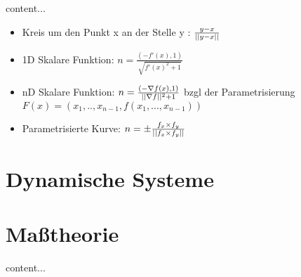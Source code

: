 \begin{definition}[Normalenvektor]
	content...
\end{definition}


\begin{satz}
	\begin{itemize}[noitemsep]
		\item Kreis um den Punkt x an der Stelle y : $\frac{y - x}{||y - x||}$
		\item 1D Skalare Funktion: $n = \frac{(-f'(x), 1)}{\sqrt{f'(x)^2 + 1}}$
		\item nD Skalare Funktion: $n = \frac{(-\nabla f(x), 1)}{ ||\nabla f||^2 + 1}$ bzgl der Parametrisierung 
		 $F(x) = (x_1, .., x_{n-1}, f(x_1, ..., x_{n-1}))$	
		\item Parametrisierte Kurve: $n = \pm \frac{f_x \times f_y}{||f_x \times f_y||}$
	\end{itemize}
\end{satz}

\pagebreak



\section{Dynamische Systeme}

\pagebreak

	\section{Maßtheorie}

\begin{definition}
	content...
\end{definition}